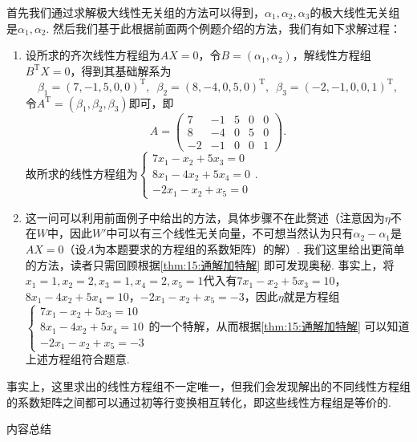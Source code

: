 \begin{solution}
    首先我们通过求解极大线性无关组的方法可以得到，$\alpha_1,\alpha_2,\alpha_3$的极大线性无关组是$\alpha_1,\alpha_2$. 然后我们基于此根据前面两个例题介绍的方法，我们有如下求解过程：
    \begin{enumerate}
        \item 设所求的齐次线性方程组为$AX=0$，令$B=(\alpha_1,\alpha_2)$，解线性方程组$B^\mathrm{T}X=0$，得到其基础解系为
              \[\beta_1=(7,-1,5,0,0)^\mathrm{T},\enspace\beta_2=(8,-4,0,5,0)^\mathrm{T},\enspace\beta_3=(-2,-1,0,0,1)^\mathrm{T},\]
              令$A^\mathrm{T}=(\beta_1,\beta_2,\beta_3)$即可，即
              \[A=\begin{pmatrix}
                      7 & -1 & 5 & 0 & 0 \\ 8 & -4 & 0 & 5 & 0 \\ -2 & -1 & 0 & 0 & 1
                  \end{pmatrix}.\]
              故所求的线性方程组为$\begin{cases}
                      7x_1-x_2+5x_3=0 \\ 8x_1-4x_2+5x_4=0 \\ -2x_1-x_2+x_5=0
                  \end{cases}.$

        \item 这一问可以利用前面例子中给出的方法，具体步骤不在此赘述（注意因为$\eta$不在$W$中，因此$W'$中可以有三个线性无关向量，不可想当然认为只有$\alpha_2-\alpha_1$是$AX=0$（设$A$为本题要求的方程组的系数矩阵）的解）. 我们这里给出更简单的方法，读者只需回顾根据\autoref{thm:15:通解加特解} 即可发现奥秘. 事实上，将$x_1=1,x_2=2,x_3=1,x_4=2,x_5=1$代入有$7x_1-x_2+5x_3=10$，$8x_1-4x_2+5x_4=10$，$-2x_1-x_2+x_5=-3$，因此$\eta$就是方程组$\begin{cases}
                      7x_1-x_2+5x_3=10 \\ 8x_1-4x_2+5x_4=10 \\ -2x_1-x_2+x_5=-3
                  \end{cases}$的一个特解，从而根据\autoref{thm:15:通解加特解} 可以知道上述方程组符合题意.
    \end{enumerate}
\end{solution}

事实上，这里求出的线性方程组不一定唯一，但我们会发现解出的不同线性方程组的系数矩阵之间都可以通过初等行变换相互转化，即这些线性方程组是等价的.

\vspace{2ex}
\centerline{\heiti \Large 内容总结}

